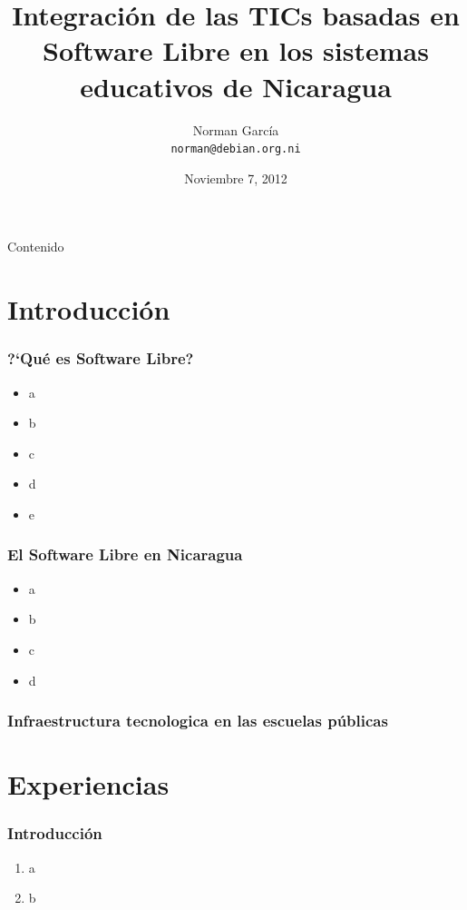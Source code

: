 \documentclass{beamer}
\title{Integraci\'on de las TICs basadas en Software Libre en los sistemas educativos de Nicaragua}
\author[n0rman]{Norman Garc\'ia \\ \texttt{norman@debian.org.ni}}
\institute{Debian Nicaragua}
\date{Noviembre 7, 2012}
\begin{document}
\begin{frame}
	\titlepage
\end{frame}

\begin{frame}{Contenido}
	\tableofcontents
\end{frame}


\section{Introducci\'on}

\begin{frame}
\frametitle{?`Qu\'e es Software Libre?}
        
	\begin{itemize}
                \pause \item  a
		\pause \item b
		\pause \item c
		\pause \item d
		\pause \item e
       \end{itemize}

\end{frame}

\begin{frame}
\frametitle{El Software Libre en Nicaragua}    
        \begin{itemize}
                \pause \item a
		\pause \item b   
		\pause \item c
	     	\pause \item d
    \end{itemize}
\end{frame}


\begin{frame}
\frametitle{Infraestructura tecnologica en las escuelas p\'ublicas}
\end{frame}


\section{Experiencias}

\begin{frame}
\frametitle{Introducci\'on}
             \begin{enumerate}
		\pause \item a
		\pause \item b
	     \end{enumerate}
\end{frame}
\end{document}
